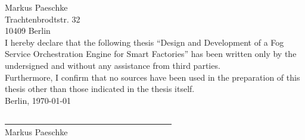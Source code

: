 \text{ }
\vspace{12.5cm}


Markus Paeschke\\
Trachtenbrodtstr. 32\\
10409 Berlin\\

I hereby declare that the following thesis ``Design and Development of a Fog Service Orchestration Engine for Smart Factories'' has been written only by the undersigned and without any assistance from third parties.\\

Furthermore, I confirm that no sources have been used in the preparation of this thesis other than those indicated in the thesis itself.\\

Berlin, \today\\
\medskip
\medskip

\medskip
\underline{~~~~~~~~~~~~~~~~~~~~~~~~~~~~~~~~~~~~~~~~}\\
Markus Paeschke\\
